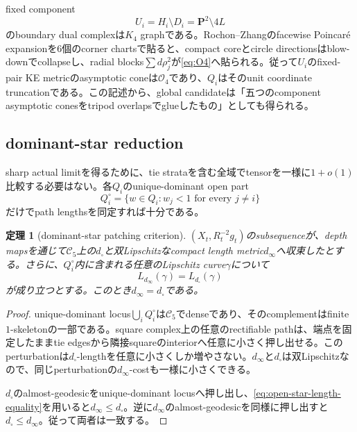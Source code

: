 \documentclass[11pt,a4paper]{ltjsarticle}
\newtheorem{theorem}{定理}[section]
\theoremstyle{definition}
\theoremstyle{remark}
\newcommand{\PP}{\mathbf P}
\newcommand{\cC}{\mathcal C}
\begin{document}
fixed component
\[
 U_i=H_i\setminus D_i=\PP^2\setminus4L
\]
のboundary dual complexは$K_4$ graphである。Rochon--Zhangのfacewise Poincaré expansion\cite{RochonZhang}を6個のcorner chartsで貼ると、compact coreとcircle directionsはblow-downでcollapseし、radial blocks$\sum d\rho_j^2$が\eqref{eq:O4}へ貼られる。従って$U_i$のfixed-pair KE metricのasymptotic coneは$\mathscr O_4$であり、$Q_i$はそのunit coordinate truncationである。この記述から、global candidateは「五つのcomponent asymptotic conesをtripod overlapsでglueしたもの」としても得られる。

\subsection{dominant-star reduction}

sharp actual limitを得るために、tie strataを含む全域でtensorを一様に$1+o(1)$比較する必要はない。各$Q_i$のunique-dominant open part
\begin{equation}\label{eq:Qi-open}
 Q_i^\circ=\{w\in Q_i:w_j<1\text{ for every }j\ne i\}
\end{equation}
だけでpath lengthsを同定すれば十分である。

\begin{theorem}[dominant-star patching criterion]\label{thm:dominant-star-criterion}
$(X_t,R_t^{-2}g_t)$のsubsequenceが、depth mapsを通じて$\cC_5$上の$d_\square$と双Lipschitzなcompact length metric$d_\infty$へ収束したとする。さらに、$Q_i^\circ$内に含まれる任意のLipschitz curve$\gamma$について
\begin{equation}\label{eq:open-star-length-equality}
 L_{d_\infty}(\gamma)=L_{d_\square}(\gamma)
\end{equation}
が成り立つとする。このとき$d_\infty=d_\square$である。
\end{theorem}

\begin{proof}
unique-dominant locus$\bigcup_iQ_i^\circ$は$\cC_5$でdenseであり、そのcomplementはfinite $1$-skeletonの一部である。square complex上の任意のrectifiable pathは、端点を固定したままtie edgesから隣接squareのinteriorへ任意に小さく押し出せる。このperturbationは$d_\square$-lengthを任意に小さくしか増やさない。$d_\infty$と$d_\square$は双Lipschitzなので、同じperturbationの$d_\infty$-costも一様に小さくできる。

$d_\square$のalmost-geodesicをunique-dominant locusへ押し出し、\eqref{eq:open-star-length-equality}を用いると$d_\infty\le d_\square$。逆に$d_\infty$のalmost-geodesicを同様に押し出すと$d_\square\le d_\infty$。従って両者は一致する。
\end{proof}
\end{document}
